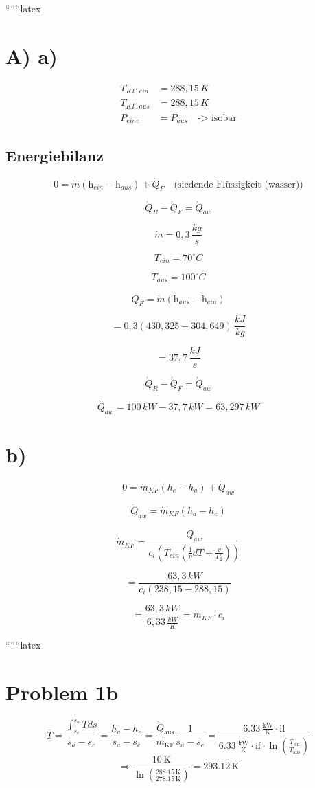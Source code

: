 
``````latex


\section*{A) a)}

\begin{align*}
T_{KF,ein} &= 288,15 \, K \\
T_{KF,aus} &= 288,15 \, K \\
P_{eine} &= P_{aus} \quad \text{-> isobar}
\end{align*}

\subsection*{Energiebilanz}

\[
0 = \dot{m} (\text{h}_{ein} - \text{h}_{aus}) + \dot{Q}_F \quad \text{(siedende Flüssigkeit (wasser))}
\]

\[
\dot{Q}_R - \dot{Q}_F = \dot{Q}_{aw}
\]

\[
\dot{m} = 0,3 \, \frac{kg}{s}
\]

\[
T_{ein} = 70^\circ C
\]

\[
T_{aus} = 100^\circ C
\]

\[
\dot{Q}_F = \dot{m} (\text{h}_{aus} - \text{h}_{ein})
\]

\[
= 0,3 (430,325 - 304,649) \, \frac{kJ}{kg}
\]

\[
= 37,7 \, \frac{kJ}{s}
\]

\[
\dot{Q}_R - \dot{Q}_F = \dot{Q}_{aw}
\]

\[
\dot{Q}_{aw} = 100 \, kW - 37,7 \, kW = 63,297 \, kW
\]

\section*{b)}

\[
0 = \dot{m}_{KF} (h_e - h_a) + \dot{Q}_{aw}
\]

\[
\dot{Q}_{aw} = \dot{m}_{KF} (h_a - h_e)
\]

\[
\dot{m}_{KF} = \frac{\dot{Q}_{aw}}{c_i \left( T_{ein} \left( \frac{1}{\eta} dT + \frac{v}{P_2} \right) \right)}
\]

\[
= \frac{63,3 \, kW}{c_i (238,15 - 288,15)}
\]

\[
= \frac{63,3 \, kW}{6,33 \, \frac{kW}{K}} = \dot{m}_{KF} \cdot c_i
\]

``````latex


\section*{Problem 1b}
\[
\overline{T} = \frac{\int_{s_e}^{s_a} T ds}{s_a - s_e} = \frac{h_a - h_e}{s_a - s_e} = \frac{\dot{Q}_{\text{aus}}}{\dot{m}_{\text{KF}}} \frac{1}{s_a - s_e} = \frac{6.33 \, \frac{\text{kW}}{\text{K}} \cdot \text{if}}{6.33 \, \frac{\text{kW}}{\text{K}} \cdot \text{if} \cdot \ln \left( \frac{T_{\text{ein}}}{T_{\text{aus}}} \right)}
\]
\[
\Rightarrow \frac{10 \, \text{K}}{\ln \left( \frac{288.15 \, \text{K}}{278.15 \, \text{K}} \right)} = 293.12 \, \text{K}
\]

